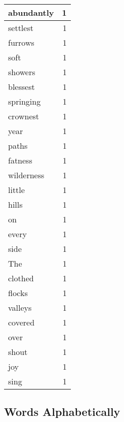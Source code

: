 \begin{center}
\begin{longtable}{l|r}
abundantly & 1 \\ \hline
settlest & 1 \\ \hline
furrows & 1 \\ \hline
soft & 1 \\ \hline
showers & 1 \\ \hline
blessest & 1 \\ \hline
springing & 1 \\ \hline
crownest & 1 \\ \hline
year & 1 \\ \hline
paths & 1 \\ \hline
fatness & 1 \\ \hline
wilderness & 1 \\ \hline
little & 1 \\ \hline
hills & 1 \\ \hline
on & 1 \\ \hline
every & 1 \\ \hline
side & 1 \\ \hline
The & 1 \\ \hline
clothed & 1 \\ \hline
flocks & 1 \\ \hline
valleys & 1 \\ \hline
covered & 1 \\ \hline
over & 1 \\ \hline
shout & 1 \\ \hline
joy & 1 \\ \hline
sing & 1 \\ \hline
\end{longtable}
\end{center}



\normalsize



\subsection{Words Alphabetically}

